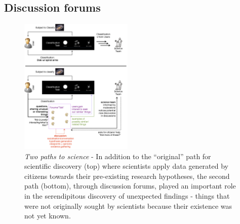 \documentclass{sigchi}
\begin{document}

\subsection{Discussion forums}

\begin{figure}
\centering
\includegraphics[width=0.48\textwidth]{imgs/twopaths.png}
\caption{\emph{Two paths to science} - In addition to the ``original'' path for scientific discovery (top) where scientists apply data generated by citizens towards their pre-existing research hypotheses, the second path (bottom), through discussion forums, played an important role in the serendipitous discovery of unexpected findings - things that were not originally sought by scientists because their existence was not yet known.}
\label{launchprofiles}
\end{figure}

\end{document}
